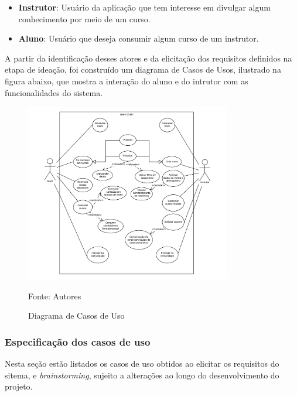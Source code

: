         \begin{itemize}
            \item \textbf{Instrutor}: Usuário da aplicação que tem interesse em divulgar algum conhecimento por meio de um curso.
            \item \textbf{Aluno}: Usuário que deseja consumir algum curso de um instrutor.
        \end{itemize}

        A partir da identificação desses atores e da elicitação dos requisitos definidos na etapa de ideação, foi construído um diagrama de Casos de Usos, ilustrado na figura abaixo, que mostra a interação do aluno e do intrutor com as funcionalidades do sistema.

        \begin{figure}[h]
            \centering
            \caption{Diagrama de Casos de Uso}
            \includegraphics[width=0.8\textwidth]{figuras/uml.png}
            \begin{center}
                {\footnotesize Fonte: Autores}
            \end{center}
            \label{fig:diagrama}
        \end{figure}
        
        \subsubsection{Especificação dos casos de uso}

        Nesta seção estão listados os casos de uso obtidos ao elicitar os requisitos do sitema, e \textit{brainstorming}, sujeito a alterações ao longo do desenvolvimento do projeto.


